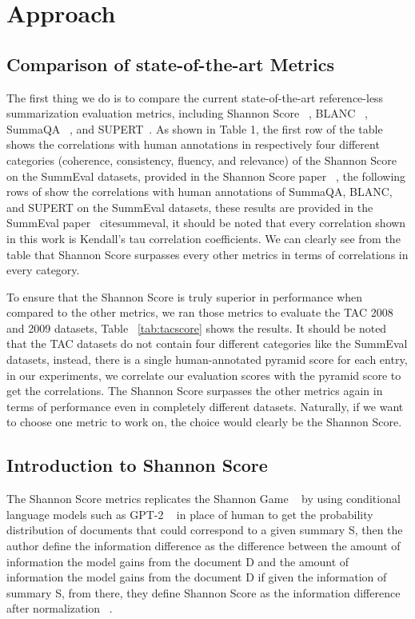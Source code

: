 \section{Approach}
\label{sec:approach}

\subsection{Comparison of state-of-the-art Metrics}
The first thing we do is to compare the current state-of-the-art reference-less summarization evaluation metrics, including Shannon Score ~\cite{shannonscore}, BLANC ~\cite{blanc}, SummaQA ~\cite{summaqa}, and SUPERT~\cite{supert}. As shown in Table 1, the first row of the table shows the correlations with human annotations in respectively four different categories (coherence, consistency, fluency, and relevance) of the Shannon Score on the SummEval datasets, provided in the Shannon Score paper ~\cite{shannonscore}, the following rows of show the correlations with human annotations of SummaQA, BLANC, and SUPERT on the SummEval datasets, these results are provided in the SummEval paper ~cite{summeval}, it should be noted that every correlation shown in this work is Kendall’s tau correlation coefficients. We can clearly see from the table that Shannon Score surpasses every other metrics in terms of correlations in every category. 

To ensure that the Shannon Score is truly superior in performance when compared to the other metrics, we ran those metrics to evaluate the TAC 2008 and 2009 datasets, Table ~\ref{tab:tacscore} shows the results. It should be noted that the TAC datasets do not contain four different categories like the SummEval datasets, instead, there is a single human-annotated pyramid score for each entry, in our experiments, we correlate our evaluation scores with the pyramid score to get the correlations. The Shannon Score surpasses the other metrics again in terms of performance even in completely different datasets. Naturally, if we want to choose one metric to work on, the choice would clearly be the Shannon Score.

\subsection{Introduction to Shannon Score}
The Shannon Score metrics replicates the Shannon Game ~\cite{shannongame} by using conditional language models such as GPT-2 ~\cite{gpt2} in place of human to get the probability distribution of documents that could correspond to a given summary S, then the author define the information difference as the difference between the amount of information the model gains from the document D and the amount of information the model gains from the document D if given the information of summary S, from there, they define Shannon Score as the information difference after normalization ~\cite{shannonscore}.

